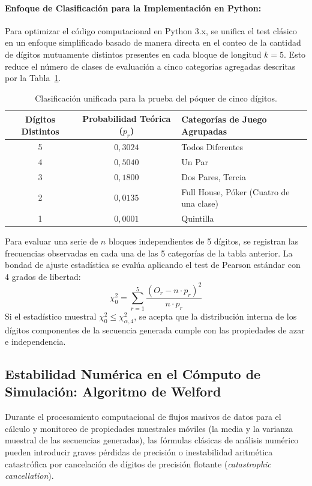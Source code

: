 \documentclass{article}
\begin{document}
\paragraph{Enfoque de Clasificación para la Implementación en Python:}
Para optimizar el código computacional en Python 3.x, se unifica el test clásico en un enfoque simplificado basado de manera directa en el conteo de la cantidad de dígitos mutuamente distintos presentes en cada bloque de longitud $k=5$. Esto reduce el número de clases de evaluación a cinco categorías agregadas descritas por la Tabla~\ref{tab:poker_classification}.

\begin{table}[htbp]
    \centering
    \caption{Clasificación unificada para la prueba del póquer de cinco dígitos.}
    \label{tab:poker_classification}
    \vspace{0.2cm}
    \begin{tabular}{ccl}
        \toprule
        \textbf{Dígitos Distintos} & \textbf{Probabilidad Teórica ($p_r$)} & \textbf{Categorías de Juego Agrupadas} \\
        \midrule
        5 & $0,3024$ & Todos Diferentes \\
        4 & $0,5040$ & Un Par \\
        3 & $0,1800$ & Dos Pares, Tercia \\
        2 & $0,0135$ & Full House, Póker (Cuatro de una clase) \\
        1 & $0,0001$ & Quintilla \\
        \bottomrule
    \end{tabular}
\end{table}

Para evaluar una serie de $n$ bloques independientes de 5 dígitos, se registran las frecuencias observadas en cada una de las 5 categorías de la tabla anterior. La bondad de ajuste estadística se evalúa aplicando el test de Pearson estándar con 4 grados de libertad:
\begin{equation}
    \chi_0^2 = \sum_{r=1}^5 \frac{(O_r - n \cdot p_r)^2}{n \cdot p_r}
\end{equation}
Si el estadístico muestral $\chi_0^2 \le \chi_{\alpha, 4}^2$, se acepta que la distribución interna de los dígitos componentes de la secuencia generada cumple con las propiedades de azar e independencia.

\newpage

\subsection{Estabilidad Numérica en el Cómputo de Simulación: Algoritmo de Welford}
Durante el procesamiento computacional de flujos masivos de datos para el cálculo y monitoreo de propiedades muestrales móviles (la media y la varianza muestral de las secuencias generadas), las fórmulas clásicas de análisis numérico pueden introducir graves pérdidas de precisión o inestabilidad aritmética catastrófica por cancelación de dígitos de precisión flotante (\emph{catastrophic cancellation}).
\end{document}
